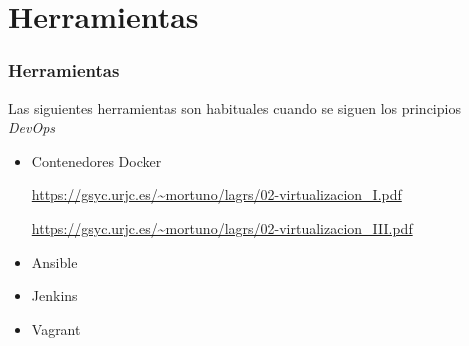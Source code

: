 \documentclass[ucs]{beamer}
\begin{document}
\section{Herramientas}
\begin{frame}[fragile]
\frametitle{Herramientas}
Las siguientes herramientas son habituales cuando se siguen los
principios
\emph{DevOps}
\begin{itemize}
\item
Contenedores Docker

\begin{tiny}
\url{https://gsyc.urjc.es/~mortuno/lagrs/02-virtualizacion_I.pdf}
\end{tiny}

\begin{tiny}
\url{https://gsyc.urjc.es/~mortuno/lagrs/02-virtualizacion_III.pdf}
\end{tiny}

\item
Ansible

\item
Jenkins

\item
Vagrant

\end{itemize}

\end{frame}
\end{document}
